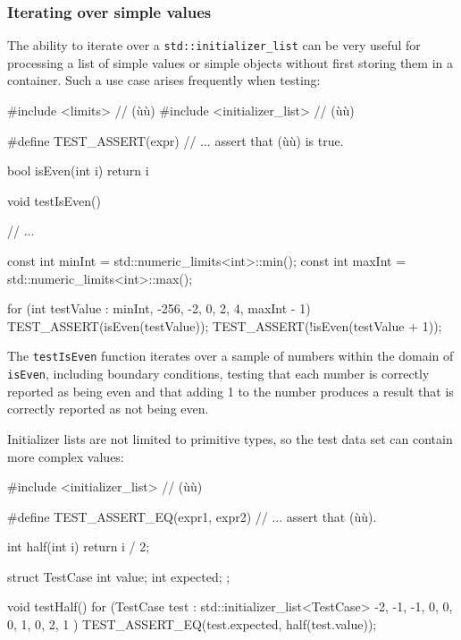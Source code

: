 {{\subsubsection[Iterating over simple values]{Iterating over simple values}\label{iterating-over-simple-values}

The ability to iterate over a \lstinline!std::initializer_list! can be
very useful for processing a list of simple values or simple objects
without first storing them in a container. Such a use case arises
frequently when testing:

\begin{emcppslisting}
#include <limits>            // (ù{}ù)
#include <initializer_list>  // (ù{}ù)

#define TEST_ASSERT(expr)  // ... assert that (ù{}ù) is true.

bool isEven(int i)
{
    return i %
}

void testIsEven()
{
    // ...

    const int minInt = std::numeric_limits<int>::min();
    const int maxInt = std::numeric_limits<int>::max();

    for (int testValue : {minInt, -256, -2, 0, 2, 4, maxInt - 1})
    {
        TEST_ASSERT(isEven(testValue));
        TEST_ASSERT(!isEven(testValue + 1));
    }
}
\end{emcppslisting}


\noindent The \lstinline!testIsEven! function iterates over a sample of numbers
within the domain of \lstinline!isEven!, including boundary conditions,
testing that each number is correctly reported as being even and that
adding 1 to the number produces a result that is correctly reported as
not being even.

Initializer lists are not limited to primitive types, so the test data
set can contain more complex values:

\begin{emcppslisting}
#include <initializer_list>  // (ù{}ù)

#define TEST_ASSERT_EQ(expr1, expr2)  // ... assert that (ù{}ù).

int half(int i)
{
    return i / 2;
}

struct TestCase
{
    int value;
    int expected;
};

void testHalf()
{
    for (TestCase test : std::initializer_list<TestCase>{
        {-2, -1}, {-1, 0}, {0, 0}, {1, 0}, {2, 1}
    })
    {
        TEST_ASSERT_EQ(test.expected, half(test.value));
    }
}
\end{emcppslisting}


}}
